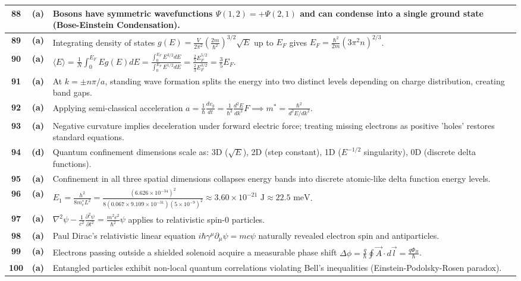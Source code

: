 {\begin{tabularx}{\textwidth}{|c|c|X|}
\textbf{88} & \textbf{(a)} & Bosons have symmetric wavefunctions $\Psi(1,2) = +\Psi(2,1)$ and can condense into a single ground state (Bose-Einstein Condensation). \\ \hline
\textbf{89} & \textbf{(a)} & Integrating density of states $g(E) = \frac{V}{2\pi^2}(\frac{2m}{\hbar^2})^{3/2}\sqrt{E}$ up to $E_F$ gives $E_F = \frac{\hbar^2}{2m}(3\pi^2 n)^{2/3}$. \\ \hline
\textbf{90} & \textbf{(a)} & $\langle E \rangle = \frac{1}{N}\int_0^{E_F} E g(E) dE = \frac{\int_0^{E_F} E^{3/2} dE}{\int_0^{E_F} E^{1/2} dE} = \frac{\frac{2}{5}E_F^{5/2}}{\frac{2}{3}E_F^{3/2}} = \frac{3}{5}E_F$. \\ \hline
\textbf{91} & \textbf{(a)} & At $k = \pm n\pi/a$, standing wave formation splits the energy into two distinct levels depending on charge distribution, creating band gaps. \\ \hline
\textbf{92} & \textbf{(a)} & Applying semi-classical acceleration $a = \frac{1}{\hbar}\frac{d v_g}{dt} = \frac{1}{\hbar^2}\frac{d^2 E}{dk^2} F \implies m^* = \frac{\hbar^2}{d^2E/dk^2}$. \\ \hline
\textbf{93} & \textbf{(a)} & Negative curvature implies deceleration under forward electric force; treating missing electrons as positive 'holes' restores standard equations. \\ \hline
\textbf{94} & \textbf{(d)} & Quantum confinement dimensions scale as: 3D ($\sqrt{E}$), 2D (step constant), 1D ($E^{-1/2}$ singularity), 0D (discrete delta functions). \\ \hline
\textbf{95} & \textbf{(a)} & Confinement in all three spatial dimensions collapses energy bands into discrete atomic-like delta function energy levels. \\ \hline
\textbf{96} & \textbf{(a)} & $E_1 = \frac{h^2}{8 m_e^* L^2} = \frac{(6.626 \times 10^{-34})^2}{8(0.067 \times 9.109 \times 10^{-31})(5 \times 10^{-9})^2} \approx 3.60 \times 10^{-21}\text{ J} \approx 22.5\text{ meV}$. \\ \hline
\textbf{97} & \textbf{(a)} & $\nabla^2\psi - \frac{1}{c^2}\frac{\partial^2\psi}{\partial t^2} = \frac{m^2 c^2}{\hbar^2}\psi$ applies to relativistic spin-0 particles. \\ \hline
\textbf{98} & \textbf{(a)} & Paul Dirac's relativistic linear equation $i\hbar\gamma^\mu\partial_\mu\psi = mc\psi$ naturally revealed electron spin and antiparticles. \\ \hline
\textbf{99} & \textbf{(a)} & Electrons passing outside a shielded solenoid acquire a measurable phase shift $\Delta\phi = \frac{q}{\hbar}\oint \vec{A}\cdot d\vec{l} = \frac{q\Phi_B}{\hbar}$. \\ \hline
\textbf{100} & \textbf{(a)} & Entangled particles exhibit non-local quantum correlations violating Bell's inequalities (Einstein-Podolsky-Rosen paradox). \\ \hline
\end{tabularx}
}


